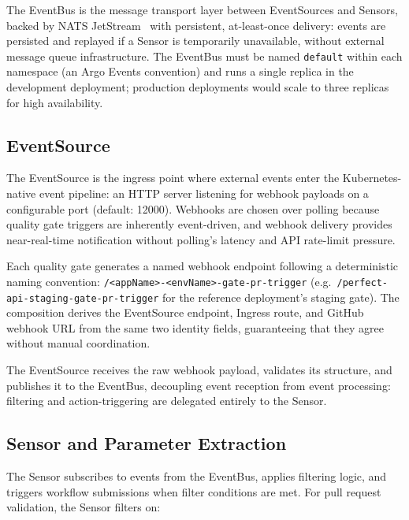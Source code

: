 The EventBus is the message transport layer between EventSources and Sensors, backed by NATS JetStream~\cite{nats-jetstream} with persistent, at-least-once delivery: events are persisted and replayed if a Sensor is temporarily unavailable, without external message queue infrastructure. The EventBus must be named \texttt{default} within each namespace (an Argo Events convention) and runs a single replica in the development deployment; production deployments would scale to three replicas for high availability.

\subsection{EventSource}
\label{subsec:eventsource}

The EventSource is the ingress point where external events enter the Kubernetes-native event pipeline: an HTTP server listening for webhook payloads on a configurable port (default: 12000). Webhooks are chosen over polling because quality gate triggers are inherently event-driven, and webhook delivery provides near-real-time notification without polling's latency and API rate-limit pressure.

Each quality gate generates a named webhook endpoint following a deterministic naming convention: \texttt{/<appName>-<envName>-gate-pr-trigger} (e.g.\ \texttt{/perfect-api-staging-gate-pr-trigger} for the reference deployment's staging gate). The composition derives the EventSource endpoint, Ingress route, and GitHub webhook URL from the same two identity fields, guaranteeing that they agree without manual coordination.

The EventSource receives the raw webhook payload, validates its structure, and publishes it to the EventBus, decoupling event reception from event processing: filtering and action-triggering are delegated entirely to the Sensor.

\subsection{Sensor and Parameter Extraction}
\label{subsec:sensor}

The Sensor subscribes to events from the EventBus, applies filtering logic, and triggers workflow submissions when filter conditions are met. For pull request validation, the Sensor filters on:

